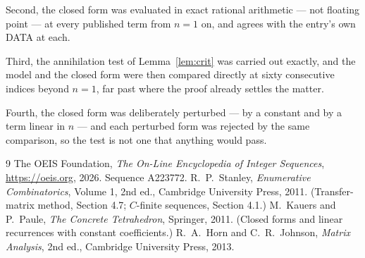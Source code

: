 \documentclass[11pt,a4paper]{article}
\theoremstyle{plain}
\theoremstyle{definition}
\begin{document}
Second, the closed form was evaluated in exact rational arithmetic --- not floating point ---
at every published term from $n=1$ on, and agrees with the entry's own DATA at each.

Third, the annihilation test of Lemma~\ref{lem:crit} was carried out exactly, and the model
and the closed form were then compared directly at sixty consecutive indices beyond
$n=1$, far past where the proof already settles the matter.

Fourth, the closed form was deliberately perturbed --- by a constant and by a term linear in
$n$ --- and each perturbed form was rejected by the same comparison, so the test is not one
that anything would pass.

\begin{thebibliography}{9}
 The OEIS Foundation, \emph{The On-Line Encyclopedia of Integer
Sequences}, \url{https://oeis.org}, 2026. Sequence A223772.
 R.~P.~Stanley, \emph{Enumerative Combinatorics}, Volume 1, 2nd ed.,
Cambridge University Press, 2011. (Transfer-matrix method, Section 4.7; $C$-finite sequences,
Section 4.1.)
 M.~Kauers and P.~Paule, \emph{The Concrete Tetrahedron}, Springer, 2011.
(Closed forms and linear recurrences with constant coefficients.)
 R.~A.~Horn and C.~R.~Johnson, \emph{Matrix Analysis}, 2nd ed., Cambridge
University Press, 2013.
\end{thebibliography}
\end{document}
